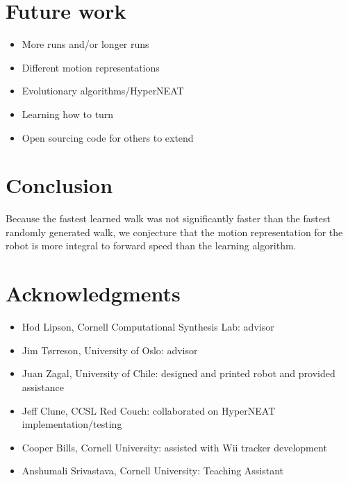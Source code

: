 \section{Future work}


\begin{itemize}
\item More runs and/or longer runs
\item Different motion representations
\item Evolutionary algorithms/HyperNEAT\cite{2}
\item Learning how to turn
\item Open sourcing code for others to extend
\end{itemize}



\section{Conclusion}


Because the fastest learned walk was not
significantly faster than the fastest randomly generated walk, we
conjecture that the motion representation for the robot is more
integral to forward speed than the learning algorithm.



\section{Acknowledgments}
\begin{itemize}
\item Hod Lipson, Cornell Computational Synthesis Lab: advisor
\item Jim T\o rreson, University of Oslo: advisor
\item Juan Zagal, University of Chile: designed and printed robot and provided assistance
\item Jeff Clune, CCSL Red Couch: collaborated on HyperNEAT implementation/testing
\item Cooper Bills, Cornell University: assisted with Wii tracker development
\item Anshumali Srivastava, Cornell University: Teaching Assistant
\end{itemize}

